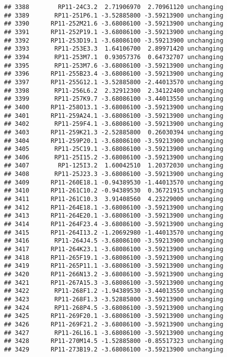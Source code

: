 \documentclass[]{article}
\begin{document}
\begin{verbatim}
## 3388        RP11-24C3.2  2.71906970  2.70961120 unchanging
## 3389       RP11-251P6.1 -3.52885800 -3.59213900 unchanging
## 3390      RP11-252M21.6 -3.68086100 -3.59213900 unchanging
## 3391      RP11-252P19.1 -3.68086100 -3.59213900 unchanging
## 3392      RP11-253D19.1 -3.68086100 -3.59213900 unchanging
## 3393       RP11-253E3.3  1.64106700  2.89971420 unchanging
## 3394       RP11-253M7.1  0.93057376  0.64732707 unchanging
## 3395       RP11-253M7.6 -3.68086100 -3.59213900 unchanging
## 3396      RP11-255B23.4 -3.68086100 -3.59213900 unchanging
## 3397      RP11-255G12.1 -3.52885800 -2.44013570 unchanging
## 3398       RP11-256L6.2  2.32912300  2.34122400 unchanging
## 3399       RP11-257K9.7 -3.68086100 -3.44013550 unchanging
## 3400      RP11-258O13.1 -3.68086100 -3.59213900 unchanging
## 3401      RP11-259A24.1 -3.68086100 -3.59213900 unchanging
## 3402       RP11-259F4.1 -3.68086100 -3.59213900 unchanging
## 3403      RP11-259K21.3 -2.52885800  0.26030394 unchanging
## 3404      RP11-259P20.1 -3.68086100 -3.59213900 unchanging
## 3405       RP11-25C19.1 -3.68086100 -3.59213900 unchanging
## 3406       RP11-25I15.2 -3.68086100 -3.59213900 unchanging
## 3407        RP1-125I3.2  1.60042510  1.20372030 unchanging
## 3408       RP11-25J23.3 -3.68086100 -3.59213900 unchanging
## 3409      RP11-260E18.1 -0.94389530 -1.44013570 unchanging
## 3410      RP11-261C10.2 -0.94389530  0.36721915 unchanging
## 3411      RP11-261C10.3  3.91408560  4.23229000 unchanging
## 3412      RP11-264E18.1 -3.68086100 -3.59213900 unchanging
## 3413      RP11-264E20.1 -3.68086100 -3.59213900 unchanging
## 3414      RP11-264F23.4 -3.68086100 -3.59213900 unchanging
## 3415      RP11-264I13.2 -1.20692980 -1.44013570 unchanging
## 3416       RP11-264J4.5 -3.68086100 -3.59213900 unchanging
## 3417      RP11-264K23.1 -3.68086100 -3.59213900 unchanging
## 3418      RP11-265F19.1 -3.68086100 -3.59213900 unchanging
## 3419      RP11-265P11.1 -3.68086100 -3.59213900 unchanging
## 3420      RP11-266N13.2 -3.68086100 -3.59213900 unchanging
## 3421      RP11-267A15.3 -3.68086100 -3.59213900 unchanging
## 3422       RP11-268F1.2 -1.94389530 -3.44013550 unchanging
## 3423       RP11-268F1.3 -3.52885800 -3.59213900 unchanging
## 3424       RP11-268P4.5 -3.68086100 -3.59213900 unchanging
## 3425      RP11-269F20.1 -3.68086100 -3.59213900 unchanging
## 3426      RP11-269F21.2 -3.68086100 -3.59213900 unchanging
## 3427       RP11-26L16.1 -3.68086100 -3.59213900 unchanging
## 3428      RP11-270M14.5 -1.52885800 -0.85517323 unchanging
## 3429      RP11-273B19.2 -3.68086100 -3.59213900 unchanging

\end{verbatim}
\end{document}
